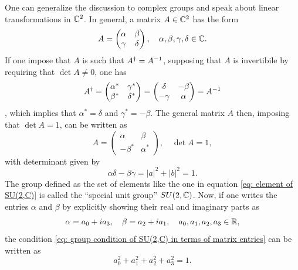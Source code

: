 One can generalize the discussion to complex groups and speak about linear transformations in $\mathbb{C}^2$. In general, a matrix $A \in \mathbb{C}^2$ has the form
\begin{equation}
    A = 
    \begin{pmatrix}
        \alpha & \beta \\
        \gamma & \delta
    \end{pmatrix}
    ,\quad \alpha,\beta,\gamma,\delta \in \mathbb{C}.
\end{equation}
If one impose that $A$ is such that $A^\dagger = A^{-1}$, supposing that $A$ is invertibile by requiring that $\det{A} \neq 0$, one has
\begin{equation}
    A^\dagger = 
    \begin{pmatrix}
        \alpha^* & \gamma^* \\
        \beta^* & \delta^*
    \end{pmatrix}
    = 
    \begin{pmatrix}
        \delta & -\beta \\
        -\gamma & \alpha
    \end{pmatrix}
    = A^{-1}
\end{equation},
which implies that $\alpha^* = \delta$ and $\gamma^* = -\beta$. The general matrix $A$ then, imposing that $\det{A} = 1$, can be written as
\begin{equation}
\label{eq: element of SU(2,C)}
    A = 
    \begin{pmatrix}
        \alpha & \beta \\
        -\beta^* & \alpha^*
    \end{pmatrix},\quad \det{A} = 1,
\end{equation}
with determinant given by 
\begin{equation}
\label{eq: group condition of SU(2,C) in terms of matrix entries}
    \alpha\delta - \beta\gamma = |a|^2 + |b|^2 = 1.
\end{equation}
The group defined as the set of elements like the one in equation \eqref{eq: element of SU(2,C)} is called the ``special unit group'' $SU(2,\mathbb{C})$. Now, if one writes the entries $\alpha$ and $\beta$ by explicitly showing their real and imaginary parts as
\begin{equation}
    \alpha = a_0 + ia_3,\quad \beta = a_2 + ia_1,\quad a_0,a_1,a_2,a_3 \in \mathbb{R},
\end{equation}
the condition \eqref{eq: group condition of SU(2,C) in terms of matrix entries} can be written as 
\begin{equation}
\label{eq: group condition of SU(2,C) in terms of the real and imaginary parts of matrix entries}
    a_0^2 + a_1^2 + a_2^2 + a_3^2 = 1.
\end{equation}
